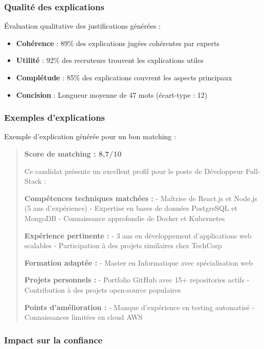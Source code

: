 \documentclass[12pt,a4paper]{report}
\begin{document}
\subsubsection{Qualité des explications}

Évaluation qualitative des justifications générées :
\begin{itemize}
\item \textbf{Cohérence} : 89\% des explications jugées cohérentes par experts
\item \textbf{Utilité} : 92\% des recruteurs trouvent les explications utiles
\item \textbf{Complétude} : 85\% des explications couvrent les aspects principaux
\item \textbf{Concision} : Longueur moyenne de 47 mots (écart-type : 12)
\end{itemize}

\subsubsection{Exemples d'explications}

Exemple d'explication générée pour un bon matching :

\begin{quote}
\textbf{Score de matching : 8,7/10}

Ce candidat présente un excellent profil pour le poste de Développeur Full-Stack :

\textbf{Compétences techniques matchées :}
- Maîtrise de React.js et Node.js (5 ans d'expérience)
- Expertise en bases de données PostgreSQL et MongoDB
- Connaissance approfondie de Docker et Kubernetes

\textbf{Expérience pertinente :}
- 3 ans en développement d'applications web scalables
- Participation à des projets similaires chez TechCorp

\textbf{Formation adaptée :}
- Master en Informatique avec spécialisation web

\textbf{Projets personnels :}
- Portfolio GitHub avec 15+ repositories actifs
- Contribution à des projets open-source populaires

\textbf{Points d'amélioration :}
- Manque d'expérience en testing automatisé
- Connaissances limitées en cloud AWS
\end{quote}

\subsubsection{Impact sur la confiance}
\end{document}
